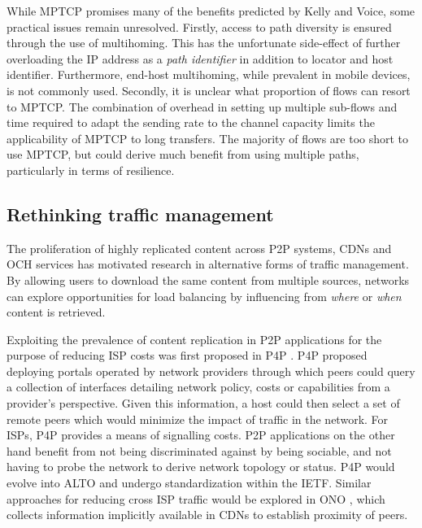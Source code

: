 While \ac{MPTCP} promises many of the benefits predicted by Kelly and Voice, some practical issues remain unresolved.
Firstly, access to path diversity is ensured through the use of multihoming. 
This has the unfortunate side-effect of further overloading the \ac{IP} address as a \emph{path identifier} in addition to locator and host identifier.
Furthermore, end-host multihoming, while prevalent in mobile devices, is not commonly used.
Secondly, it is unclear what proportion of flows can resort to \ac{MPTCP}.
The combination of overhead in setting up multiple sub-flows and time required to adapt the sending rate to the channel capacity limits the applicability of \ac{MPTCP} to long transfers.
The majority of flows are too short to use \ac{MPTCP}, but could derive much benefit from using multiple paths, particularly in terms of resilience.

\subsection{Rethinking traffic management}
The proliferation of highly replicated content across \ac{P2P} systems, \acp{CDN} and \ac{OCH} services has motivated research in alternative forms of traffic management.
By allowing users to download the same content from multiple sources, networks can explore opportunities for load balancing by influencing from \emph{where} or \emph{when} content is retrieved.

Exploiting the prevalence of content replication in \ac{P2P} applications for the purpose of reducing ISP costs was first proposed in \ac{P4P} \cite{Xie:2008p531}.
\ac{P4P} proposed deploying portals operated by network providers through which peers could query a collection of interfaces detailing network policy, costs or capabilities from a provider's perspective. 
Given this information, a host could then select a set of remote peers which would minimize the impact of traffic in the network.
For \acp{ISP}, \ac{P4P} provides a means of signalling costs.
\ac{P2P} applications on the other hand benefit from not being discriminated against by being sociable, and not having to probe the network to derive network topology or status.
\ac{P4P} would evolve into \ac{ALTO} and undergo standardization within the \ac{IETF}.
Similar approaches for reducing cross \ac{ISP} traffic would be explored in ONO \cite{Choffnes:2008p532}, which collects information implicitly available in \acp{CDN} to establish proximity of peers.

